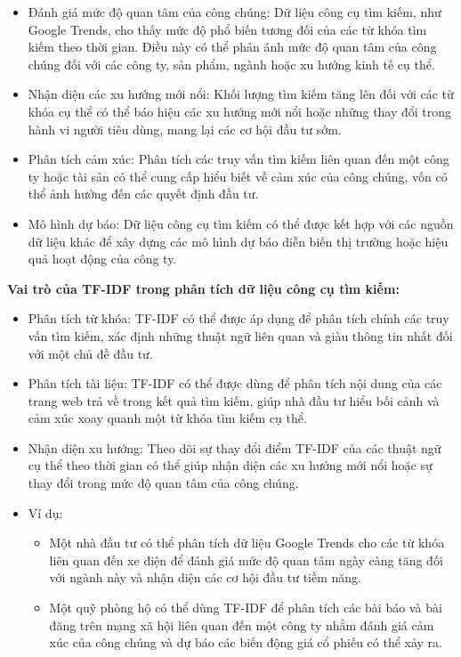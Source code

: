 \begin{itemize}
  \item Đánh giá mức độ quan tâm của công chúng: Dữ liệu công cụ tìm kiếm, như Google Trends, cho thấy mức độ phổ biến tương đối của các từ khóa tìm kiếm theo thời gian. Điều này có thể phản ánh mức độ quan tâm của công chúng đối với các công ty, sản phẩm, ngành hoặc xu hướng kinh tế cụ thể.
  \item Nhận diện các xu hướng mới nổi: Khối lượng tìm kiếm tăng lên đối với các từ khóa cụ thể có thể báo hiệu các xu hướng mới nổi hoặc những thay đổi trong hành vi người tiêu dùng, mang lại các cơ hội đầu tư sớm.
  \item Phân tích cảm xúc: Phân tích các truy vấn tìm kiếm liên quan đến một công ty hoặc tài sản có thể cung cấp hiểu biết về cảm xúc của công chúng, vốn có thể ảnh hưởng đến các quyết định đầu tư.
  \item Mô hình dự báo: Dữ liệu công cụ tìm kiếm có thể được kết hợp với các nguồn dữ liệu khác để xây dựng các mô hình dự báo diễn biến thị trường hoặc hiệu quả hoạt động của công ty.
\end{itemize}

\textbf{Vai trò của TF-IDF trong phân tích dữ liệu công cụ tìm kiếm:}

\begin{itemize}
  \item Phân tích từ khóa: TF-IDF có thể được áp dụng để phân tích chính các truy vấn tìm kiếm, xác định những thuật ngữ liên quan và giàu thông tin nhất đối với một chủ đề đầu tư.
  \item Phân tích tài liệu: TF-IDF có thể được dùng để phân tích nội dung của các trang web trả về trong kết quả tìm kiếm, giúp nhà đầu tư hiểu bối cảnh và cảm xúc xoay quanh một từ khóa tìm kiếm cụ thể.
  \item Nhận diện xu hướng: Theo dõi sự thay đổi điểm TF-IDF của các thuật ngữ cụ thể theo thời gian có thể giúp nhận diện các xu hướng mới nổi hoặc sự thay đổi trong mức độ quan tâm của công chúng.
  \item Ví dụ:
  \begin{itemize}
    \item Một nhà đầu tư có thể phân tích dữ liệu Google Trends cho các từ khóa liên quan đến xe điện để đánh giá mức độ quan tâm ngày càng tăng đối với ngành này và nhận diện các cơ hội đầu tư tiềm năng.
    \item Một quỹ phòng hộ có thể dùng TF-IDF để phân tích các bài báo và bài đăng trên mạng xã hội liên quan đến một công ty nhằm đánh giá cảm xúc của công chúng và dự báo các biến động giá cổ phiếu có thể xảy ra.
  \end{itemize}
\end{itemize}

